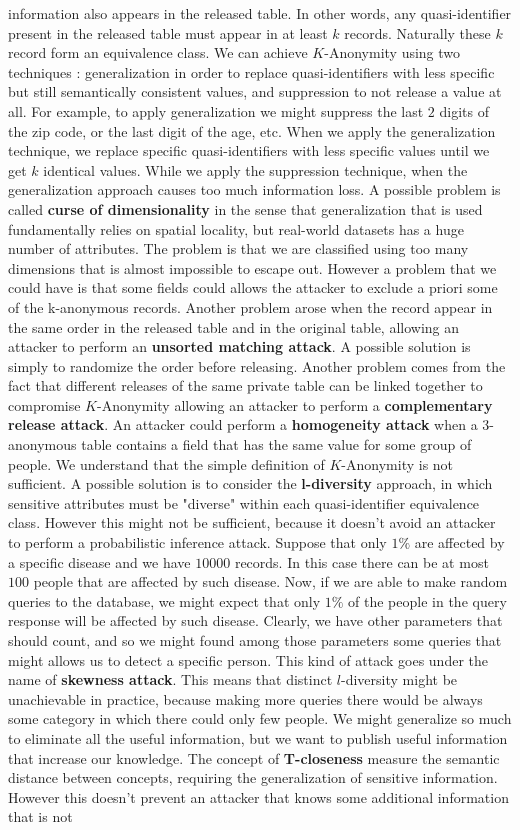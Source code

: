 information also appears in the released table. In other words, any quasi-identifier present in the released table must appear in at least $k$ records. Naturally these $k$ record form an equivalence class. We can achieve $K$-Anonymity using two techniques : generalization in order to replace quasi-identifiers with less specific but still semantically consistent values, and suppression to not release a value at all. For example, to apply generalization we might suppress the last $2$ digits of the zip code, or the last digit of the age, etc. When we apply the generalization technique, we replace specific quasi-identifiers with less specific values until we get $k$ identical values. While we apply the suppression technique, when the generalization approach causes too much information loss. A possible problem is called \textbf{curse of dimensionality} in the sense that generalization that is used fundamentally relies on spatial locality, but real-world datasets has a huge number of attributes. The problem is that we are classified using too many dimensions that is almost impossible to escape out. However a problem that we could have is that some fields could allows the attacker to exclude a priori some of the k-anonymous records. Another problem arose when the record appear in the same order in the released table and in the original table, allowing an attacker to perform an \textbf{unsorted matching attack}. A possible solution is simply to randomize the order before releasing. Another problem comes from the fact that different releases of the same private table can be linked together to compromise $K$-Anonymity allowing an attacker to perform a \textbf{complementary release attack}. An attacker could perform a \textbf{homogeneity attack} when a $3$-anonymous table contains a field that has the same value for some group of people. We understand that the simple definition of $K$-Anonymity is not sufficient. A possible solution is to consider the \textbf{l-diversity} approach, in which sensitive attributes must be "diverse" within each quasi-identifier equivalence class. However this might not be sufficient, because it doesn't avoid an attacker to perform a probabilistic inference attack. Suppose that only $1 \%$ are affected by a specific disease and we have $10000$ records. In this case there can be at most $100$ people that are affected by such disease. Now, if we are able to make random queries to the database, we might expect that only $1 \%$ of the people in the query response will be affected by such disease. Clearly, we have other parameters that should count, and so we might found among those parameters some queries that might allows us to detect a specific person. This kind of attack goes under the name of \textbf{skewness attack}. This means that distinct $l$-diversity might be unachievable in practice, because making more queries there would be always some category in which there could only few people. We might generalize so much to eliminate all the useful information, but we want to publish useful information that increase our knowledge. The concept of \textbf{T-closeness} measure the semantic distance between concepts, requiring the generalization of sensitive information. However this doesn't prevent an attacker that knows some additional information that is not 